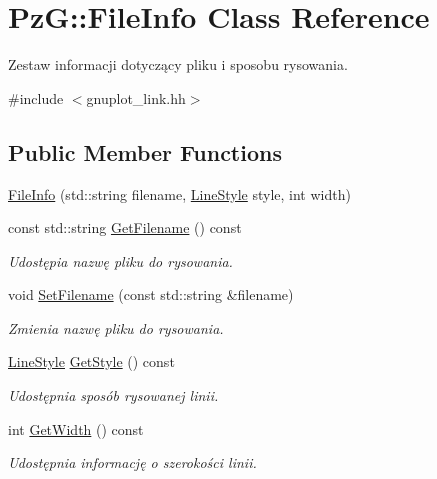 \hypertarget{class_pz_g_1_1_file_info}{}\section{PzG\+:\+:File\+Info Class Reference}
\label{class_pz_g_1_1_file_info}


Zestaw informacji dotyczący pliku i sposobu rysowania.  




{\ttfamily \#include $<$gnuplot\+\_\+link.\+hh$>$}

\subsection*{Public Member Functions}
\begin{DoxyCompactItemize}
\item 
\hyperlink{class_pz_g_1_1_file_info_a09603738e0fbc8d6dadda905a5e947d7}{File\+Info} (std\+::string filename, \hyperlink{namespace_pz_g_ab0580cdb6bfe9e51d7de2588bc824076}{Line\+Style} style, int width)
\item 
const std\+::string \hyperlink{class_pz_g_1_1_file_info_a25d23a5d9986ebb89edbd01185a26f10}{Get\+Filename} () const
\begin{DoxyCompactList}\small\item\em Udostępia nazwę pliku do rysowania. \end{DoxyCompactList}\item 
void \hyperlink{class_pz_g_1_1_file_info_a02c728f892c6f169b738adac8ed9d5f1}{Set\+Filename} (const std\+::string \&filename)
\begin{DoxyCompactList}\small\item\em Zmienia nazwę pliku do rysowania. \end{DoxyCompactList}\item 
\hyperlink{namespace_pz_g_ab0580cdb6bfe9e51d7de2588bc824076}{Line\+Style} \hyperlink{class_pz_g_1_1_file_info_aa8a3328daf9365064a98a0dc67f128b8}{Get\+Style} () const
\begin{DoxyCompactList}\small\item\em Udostępnia sposób rysowanej linii. \end{DoxyCompactList}\item 
int \hyperlink{class_pz_g_1_1_file_info_a336ec97881b709c3bf01d2f27c124e78}{Get\+Width} () const
\begin{DoxyCompactList}\small\item\em Udostępnia informację o szerokości linii. \end{DoxyCompactList}\end{DoxyCompactItemize}


